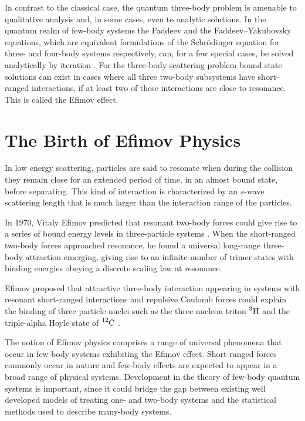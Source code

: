 In contrast to the classical case, the quantum three-body problem is amenable to qualitative analysis \cite{efimov1990qualitative} and, in some cases, even to analytic solutions. In the quantum realm of few-body systems the Faddeev and the Faddeev--Yakubovsky equations, which are equivalent formulations of the Schr{\"o}dinger equation for three- and four-body systems respectively, can, for a few special cases, be solved analytically by iteration \cite{Faddeev:1960su, Zubarev:1994}. For the three-body scattering problem bound state solutions can exist in cases where all three two-body subsystems have short-ranged interactions, if at least two of these interactions are close to resonance. This is called the Efimov effect. 

\section{The Birth of Efimov Physics}
In low energy scattering, particles are said to resonate when during the collision they remain close for an extended period of time, in an almost bound state, before separating. This kind of interaction is characterized by an $s$-wave scattering length that is much larger than the interaction range of the particles. 

In 1970, Vitaly Efimov predicted that resonant two-body forces could give rise to a series of bound energy levels in three-particle systems \cite{Efimov:1970zz}. When the short-ranged two-body forces approached resonance, he found a universal long-range three-body attraction emerging, giving rise to an infinite number of trimer states with binding energies obeying a discrete scaling law at resonance.  

Efimov proposed that attractive three-body interaction appearing in systems with resonant short-ranged interactions and repulsive Coulomb forces could explain the binding of three particle nuclei such as the three nucleon triton $\prescript{3}{}{\mathrm{H}}$ and the triple-alpha Hoyle state of $\prescript{12}{}{\mathrm{C}}$ \cite{Efimov:1970zz,Efimov:1971zz}.

The notion of Efimov physics comprises a range of universal phenomena that occur in few-body systems exhibiting the Efimov effect. Short-ranged forces commonly occur in nature and few-body effects are expected to appear in a broad range of physical systems. Development in the theory of few-body quantum systems is important, since it could bridge the gap between existing well developed models of treating one- and two-body systems and the statistical methods used to describe many-body systems.

